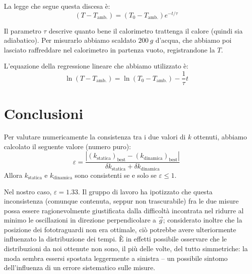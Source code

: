 \documentclass{article}
\begin{document}
    La legge che segue questa discesa è: \[(T-T_\text{amb.})=(T_0-T_\text{amb.}) e^{-t/\tau}\]

    Il parametro $\tau$ descrive quanto bene il calorimetro trattenga il calore
    (quindi sia adiabatico). Per misurarlo abbiamo scaldato $\qty{200}{g}$ d'acqua, che abbiamo
    poi lasciato raffreddare nel calorimetro in partenza vuoto, registrandone la $T$.

    L'equazione della regressione lineare che abbiamo utilizzato è:
    \[\ln(T-T_\text{amb.})=\ln(T_0-T_\text{amb.})-\frac{1}{\tau}t\]

\section{Conclusioni}
Per valutare numericamente la consistenza tra i due valori di $k$ ottenuti,
abbiamo calcolato il seguente valore (numero puro):
\[
    \varepsilon =
    \frac{
        \left|\left(k_\text{statica}\right)_\text{best} - \left(k_\text{dinamica}\right)_\text{best}\right|
    }{
        \delta k_\text{statica} + \delta k_\text{dinamica}
    }
\]
Allora $k_\text{statica}$ e $k_\text{dinamica}$ sono consistenti se e solo se $\varepsilon \le 1$.

Nel nostro caso, $\varepsilon = 1.33$. Il gruppo di lavoro ha ipotizzato che
questa inconsistenza (comunque contenuta, seppur non trascurabile) fra le due
misure possa essere ragionevolmente giustificata dalla difficoltà incontrata
nel ridurre al minimo le oscillazioni in direzione perpendicolare a $\vec{g}$;
considerato inoltre che la posizione dei fototraguardi non era ottimale, ciò
potrebbe avere ulteriormente influenzato la distribuzione dei tempi. È in
effetti possibile osservare che le distribuzioni da noi ottenute non sono,
il più delle volte, del tutto simmetriche: la moda sembra essersi spostata
leggermente a sinistra – un possibile sintomo dell'influenza di un
errore sistematico sulle misure.
\end{document}
